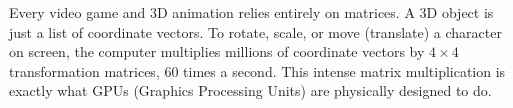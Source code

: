 Every video game and 3D animation relies entirely on matrices. A 3D object is just a list of coordinate vectors. To rotate, scale, or move (translate) a character on screen, the computer multiplies millions of coordinate vectors by $4 \times 4$ transformation matrices, 60 times a second. This intense matrix multiplication is exactly what GPUs (Graphics Processing Units) are physically designed to do.
